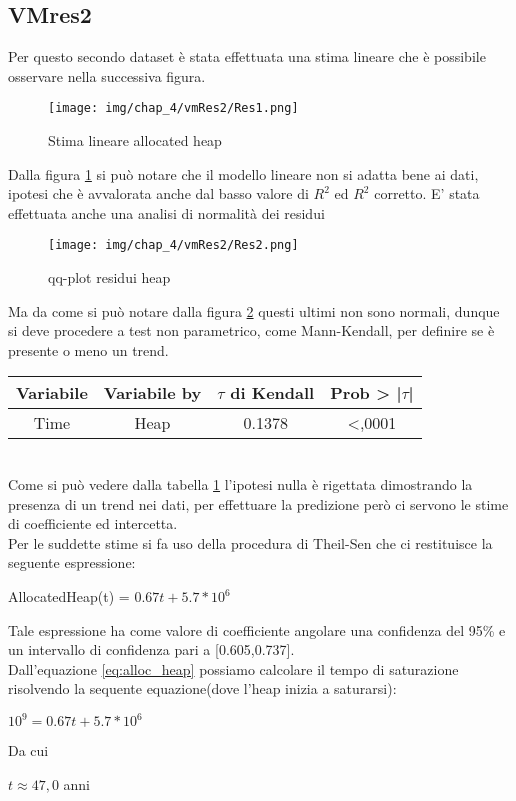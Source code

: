 \subsection{VMres2}

Per questo secondo dataset è stata effettuata una stima lineare che è possibile osservare nella successiva figura.
\begin{figure}[H]
    \centering
    \texttt{[image: img/chap\_4/vmRes2/Res1.png]}
    \caption{Stima lineare allocated heap}
    \label{fig:stim_lin_VmRes1}
\end{figure}
\noindent
Dalla figura \ref{fig:stim_lin_VmRes1} si può notare che il modello lineare non si adatta bene ai dati, ipotesi che è avvalorata anche dal basso valore di $R^2$ ed $R^2$ corretto.
E' stata effettuata anche una analisi di normalità dei residui
\begin{figure}[H]
    \centering
    \texttt{[image: img/chap\_4/vmRes2/Res2.png]}
    \caption{qq-plot residui heap}
    \label{fig:qq_plot_VmRes1}
\end{figure}
Ma da come si può notare dalla figura \ref{fig:qq_plot_VmRes1} questi ultimi non sono normali, dunque si deve procedere a test non parametrico, come Mann-Kendall, per definire se è presente o meno un trend.\\
\begin{table}[htbp]
    \centering
    \label{tab:Mann-kendall}
    \begin{tabular}{|c|c|c|c|} %
        \hline
        Variabile & Variabile by & $\tau$ di Kendall &Prob > |$\tau$| \\ %
        \hline
        Time & Heap & 0.1378 & <,0001\\
        \hline
    \end{tabular}
\end{table}
\\
Come si può vedere dalla tabella \ref{tab:Mann-kendall} l'ipotesi nulla è rigettata dimostrando la presenza di un trend nei dati, per effettuare la predizione però ci servono le stime di coefficiente ed intercetta.\\
Per le suddette stime si fa uso della procedura di Theil-Sen che ci restituisce la seguente espressione:
\begin{center}
   AllocatedHeap(t) = $0.67t + 5.7*10^6$
   \label{eq:alloc_heap}
\end{center}
Tale espressione ha come valore di coefficiente angolare una confidenza del 95\% e un intervallo di confidenza pari a [0.605,0.737].\\
Dall'equazione \ref{eq:alloc_heap} possiamo calcolare il tempo di saturazione risolvendo la sequente equazione(dove l'heap inizia a saturarsi):
\begin{center}
    $
    10^9 = 0.67t+5.7*10^6
    $\\
\end{center}
Da cui 
\begin{center}
    $
    t \approx 47,0$ anni
\end{center}

